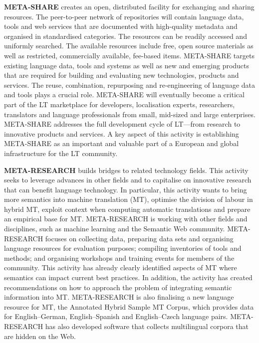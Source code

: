\begin{multicols}{2}
\textbf{META-SHARE} creates an open, distributed facility for exchanging and sharing resources. The peer-to-peer network of repositories will contain language data, tools and web services that are documented with high-quality metadata and organised in standardised categories. The resources can be readily accessed and uniformly searched. The available resources include free, open source materials as well as restricted, commercially available, fee-based items. META-SHARE targets existing language data, tools and systems as well as new and emerging products that are required for building and evaluating new technologies, products and services. The reuse, combination, repurposing and re-engineering of language data and tools plays a crucial role. META-SHARE will eventually become a critical part of the LT marketplace for developers, localisation experts, researchers, translators and language professionals from small, mid-sized and large enterprises. META-SHARE addresses the full development cycle of LT—from research to innovative products and services. A key aspect of this activity is establishing META-SHARE as an important and valuable part of a European and global infrastructure for the LT community. 

\textbf{META-RESEARCH} builds bridges to related technology fields. This activity seeks to leverage advances in other fields and to capitalise on innovative research that can benefit language technology. In particular, this activity wants to bring more semantics into machine translation (MT), optimise the division of labour in hybrid MT, exploit context when computing automatic translations and prepare an empirical base for MT. META-RESEARCH is working with other fields and disciplines, such as machine learning and the Semantic Web community. META-RESEARCH focuses on collecting data, preparing data sets and organising language resources for evaluation purposes; compiling inventories of tools and methods; and organising workshops and training events for members of the community. This activity has already clearly identified aspects of MT where semantics can impact current best practices. In addition, the activity has created recommendations on how to approach the problem of integrating semantic information into MT. META-RESEARCH is also finalising a new language resource for MT, the Annotated Hybrid Sample MT Corpus, which provides data for English--German, English--Spanish and English--Czech language pairs. META-RESEARCH has also developed software that collects multilingual corpora that are hidden on the Web.
\end{multicols}

